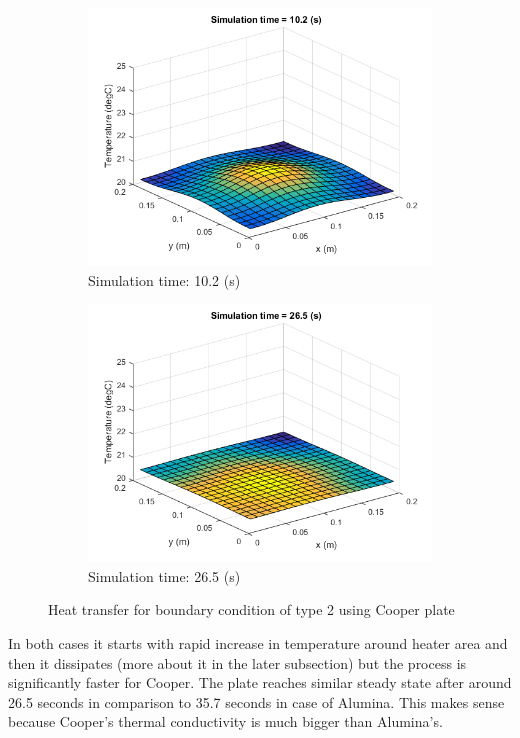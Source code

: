 \documentclass[12pt]{article}
\begin{document}
\begin{figure}[H]
\begin{subfigure}[b]{0.475\textwidth}
		\includegraphics[width=\textwidth]{b2cC}
		{{\small Simulation time: 10.2 (s)}}    
	\end{subfigure}
	\quad
	\begin{subfigure}[b]{0.475\textwidth}   
		\centering 
		\includegraphics[width=\textwidth]{b2dD}
		{{\small Simulation time: 26.5 (s)}}    
	\end{subfigure}
	{\small Heat transfer for boundary condition of type 2 using Cooper plate} 
\end{figure}

In both cases it starts with rapid increase in temperature around heater area and then it dissipates (more about it in the later subsection) but the process is significantly faster for Cooper. The plate reaches similar steady state after around 26.5 seconds in comparison to 35.7 seconds in case of Alumina. This makes sense because Cooper's thermal conductivity is much bigger than Alumina's.
\end{document}
